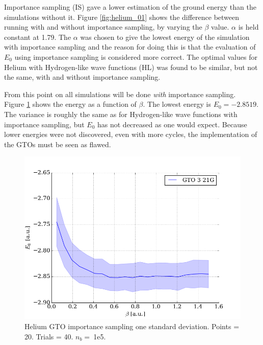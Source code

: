 \documentclass[twocolumns, a4paper,11pt,fleqn]{extarticle}
\begin{document}

\noindent Importance sampling (IS) gave a lower estimation of the ground energy than
the simulations without it. Figure \ref{fig:helium_01} shows the difference between
running with and without importance sampling, by varying the $\beta$ value. 
$\alpha$ is held constant at 1.79. 
The $\alpha$ was chosen to give the lowest energy of the simulation with 
importance sampling and the reason for doing this is that the evaluation of $E_0$ using
importance sampling is considered more correct.
The optimal values for Helium with Hydrogen-like wave functions (HL) was found to be 
similar, but not the same, with and without importance sampling.

From this point on all simulations will be done \textit{with} importance sampling.\\

\noindent Figure \ref{fig:helium_05} shows the energy as a function of $\beta$. 
The lowest energy is $E_0 = -2.8519$. 
The variance is roughly the same as for Hydrogen-like wave functions 
with importance sampling,
but $E_0$ has not decreased as one would expect. Because lower energies were
not discovered, even with more cycles, 
the implementation of the GTOs must be seen as flawed.

\begin{figure}[H]
	\includegraphics[width=\columnwidth]{../res/plot/helium_05/helium_05_pretty.png}
	\caption{Helium GTO importance sampling one standard deviation. 
	Points = 20. Trials = 40.	$n_b = \:$1e5.}
	\label{fig:helium_05}
\end{figure}
\end{document}
